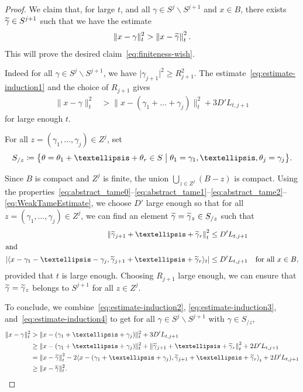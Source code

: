 \documentclass[10pt,a4paper]{amsart}
\newcommand{\innone}[2]{{\langle#2\rangle_{#1}}}
\newcommand{\binnone}[2]{{\left\langle#2\right\rangle_{#1}}}
\newcommand{\normsq}[1]{\|#1\|^{2}}
\newcommand{\normbsq}[1]{\left\|#1\right\|^{2}}
\newcommand{\refnormsq}[1]{\lvert#1\rvert^{2}}
\newcommand{\abss}[1]{\left\lvert #1\right\rvert}
\renewcommand{\setminus}{\smallsetminus}
\let\oldtilde\tilde
\renewcommand*{\tilde}[1]{\mathchoice{\widetilde{#1}}{\widetilde{#1}}{\oldtilde{#1}}{\oldtilde{#1}}}
\theoremstyle{definition}\newtheorem{defi}[cdrthm]{Definition}
\begin{document}
\begin{proof}
We claim that, for large $t$, and all $\gamma \in S^j \setminus S^{j+1}$ and $x \in B$, there exists $\tilde \gamma \in S^{j+1}$ such that we have the estimate
\begin{equation}\label{eq:FinitenessFinalStep}
\normsq{x - \gamma}_t > \normbsq{x - \tilde \gamma}_t.
\end{equation}
This will prove the desired claim~\eqref{eq:finiteness-wish}.



Indeed for all $\gamma \in S^j \setminus S^{j+1}$, we have $\refnormsq{\gamma_{j+1}} \ge R_{j+1}^2$. The estimate~\eqref{eq:estimate-induction1} and the choice of $R_{j+1}$ gives
\begin{align}\label{eq:estimate-induction2}
\normsq{x - \gamma}_t & > \normsq{x-(\gamma_1 + \dots +\gamma_j)}_t + 3D' L_{t, j+1}
\end{align}
for large enough $t$.



For all $z = (\gamma_1, \dots, \gamma_j) \in Z^j$, set
\[
S_{/z} \coloneqq \bigl\{ \theta =\theta_1+ \dots+\theta_r \in S\bigm| \theta_1=\gamma_1, \dots, \theta_j = \gamma_j\bigr\}.
\]

Since $B$ is compact and $Z^j$ is finite, the union $\bigcup_{z\in Z^j} \left(B -z\right)$ is compact. Using the properties~\eqref{eq:abstract_tame0}--\eqref{eq:abstract_tame1}--\eqref{eq:abstract_tame2}--\eqref{eq:WeakTameEstimate}, we choose $D'$ large enough so that for all $z =(\gamma_1, \dots, \gamma_j)\in Z^j$, we can find an element $\tilde \gamma = \tilde\gamma_z \in S_{/z}$ such that
\begin{align}
\normbsq{\tilde \gamma_{j+1} + \dots + \tilde \gamma_r}_t &\leq D' L_{t, j+1} \label{eq:estimate-induction3} \\
\intertext{and}
\abss{\innone{t}{x-\gamma_1-\dots-\gamma_j, \tilde \gamma_{j+1} + \dots + \tilde \gamma_r }} &\leq D' L_{t,j+1} \quad \text{for all $x\in B$},\label{eq:estimate-induction4}
\end{align}
provided that $t$ is large enough. Choosing $R_{j+1}$ large enough, we can ensure that $\tilde \gamma = \tilde\gamma_z$ belongs to $S^{j+1}$ for all $z \in Z^j$.

To conclude, we combine~\eqref{eq:estimate-induction2}, \eqref{eq:estimate-induction3}, and~\eqref{eq:estimate-induction4} to get for all $\gamma \in S^j \setminus S^{j+1}$ with $\gamma \in S_{/z}$,
\begin{align*}
\normsq{x - \gamma}_t & > \normsq{x-(\gamma_1 + \dots +\gamma_j)}_t + 3D' L_{t, j+1} \\
&\ge \normsq{x-(\gamma_1 + \dots +\gamma_j)}_t + \normbsq{\tilde \gamma_{j+1} + \dots + \tilde \gamma_r}_t + 2 D' L_{t,j+1} \\
& = \normbsq{x- \tilde \gamma}_t - 2 \binnone{t}{x-(\gamma_1 + \dots +\gamma_j), \tilde \gamma_{j+1} + \dots + \tilde \gamma_r } + 2 D' L_{t,j+1} \\
&\ge \normsq{x- \tilde \gamma}_t.
\end{align*}


\end{proof}
\end{document}
